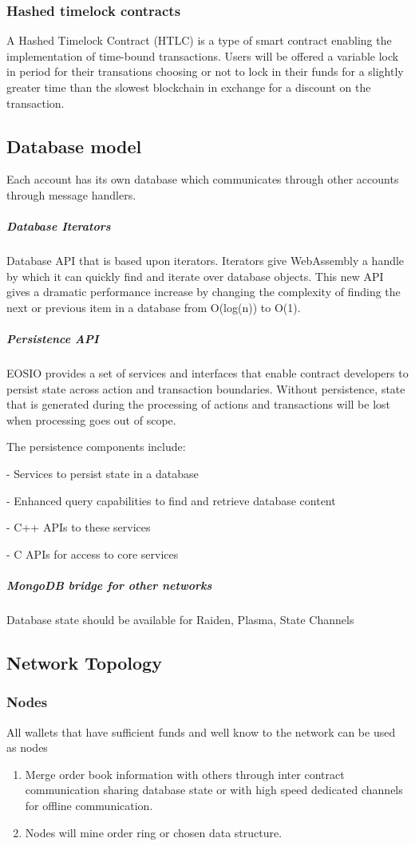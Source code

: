\documentclass[]{article}
\begin{document}
	\subsubsection{Hashed timelock contracts}
	A Hashed Timelock Contract (HTLC) is a type of smart contract enabling the implementation of time-bound transactions.
	Users will be offered a variable lock in period for their transations choosing or not
	to lock in their funds for a slightly greater time than the slowest blockchain in exchange for a discount on the transaction.
	
	\subsection{Database model}
	 Each account has its own database which communicates through other accounts through message handlers.
	
	\subparagraph{Database Iterators}
	Database API that is based upon iterators. Iterators give WebAssembly a handle by which it can quickly find and iterate over database objects. This new API gives a dramatic performance increase by changing the complexity of finding the next or previous item in a database from O(log(n)) to O(1).

	\subparagraph{Persistence API}
	
	EOSIO provides a set of services and interfaces that enable 
	contract developers to persist state across action and transaction 
	boundaries. Without persistence, state that is generated during 
	the processing of actions and transactions will be lost when 
	processing goes out of scope. 
	
	The persistence components include:
	
	- Services to persist state in a database
	
	- Enhanced query capabilities to 
	  find and retrieve database content
	
	- C++ APIs to these services
	
	- C APIs for access to core services

	\subparagraph{MongoDB bridge for other networks}
	Database state should be available for Raiden, Plasma, State Channels
	
	\subsection{Network Topology}
	\subsubsection{Nodes}
	All wallets that have sufficient funds and well know to the network can be used as nodes\\
	\begin{enumerate}
		\item Merge order book information with others through inter contract communication sharing database state or with high speed dedicated channels for offline communication.
		\item Nodes will mine order ring or chosen data structure.
	\end{enumerate}
	
\end{document}
